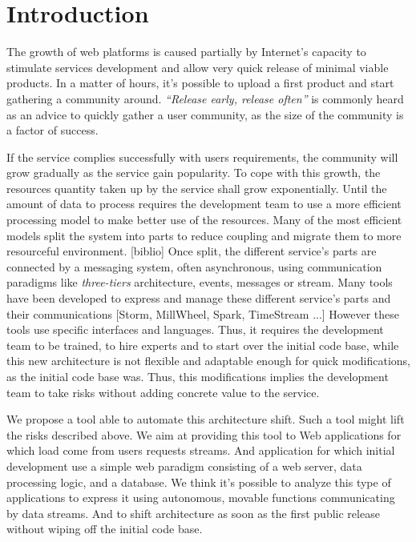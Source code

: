 \section{Introduction}


The growth of web platforms is caused partially by Internet's capacity to stimulate services development and allow very quick release of minimal viable products.
In a matter of hours, it's possible to upload a first product and start gathering a community around.
\textit{``Release early, release often''} is commonly heard as an advice to quickly gather a user community, as the size of the community is a factor of success.

If the service complies successfully with users requirements, the community will grow gradually as the service gain popularity.
To cope with this growth, the resources quantity taken up by the service shall grow exponentially.
Until the amount of data to process requires the development team to use a more efficient processing model to make better use of the resources.
Many of the most efficient models split the system into parts to reduce coupling and migrate them to more resourceful environment. [biblio]
Once split, the different service's parts are connected by a messaging system, often asynchronous, using communication paradigms like \textit{three-tiers} architecture, events, messages or stream.
Many tools have been developed to express and manage these different service's parts and their communications [Storm, MillWheel, Spark, TimeStream ...]
However these tools use specific interfaces and languages.
Thus, it requires the development team to be trained, to hire experts and to start over the initial code base, while this new architecture is not flexible and adaptable enough for quick modifications, as the initial code base was.
Thus, this modifications implies the development team to take risks without adding concrete value to the service.

We propose a tool able to automate this architecture shift.
Such a tool might lift the risks described above.
We aim at providing this tool to Web applications for which load come from users requests streams.
And application for which initial development use a simple web paradigm consisting of a web server, data processing logic, and a database.
We think it's possible to analyze this type of applications to express it using autonomous, movable functions communicating by data streams.
And to shift architecture as soon as the first public release without wiping off the initial code base.

